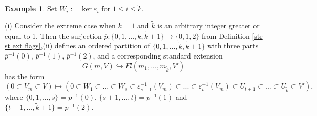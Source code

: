 \documentclass[12pt]{amsart}
\theoremstyle{definition}
\newtheorem{example}[theorem]{Example}
\begin{document}
\begin{example}\label{example 3.3}
Set $W_i:=\ker\varepsilon_i$ for $1\le i\le\tilde{k}$.

(i) Consider the extreme case when $k=1$ and $\tilde{k}$ is an 
arbitrary integer greater or equal to 1. Then the surjection 
$\overline{p}:\{0,1,...,\tilde{k},\tilde{k}+1\}\to\{0,1,2\}$ 
from Definition \ref{str st ext flags},(ii)
defines an ordered partition of $\{0,1,...,\tilde{k},
\tilde{k}+1\}$ with three parts $\overline{p}^{-1}(0)$, 
$\overline{p}^{-1}(1)$, $\overline{p}^{-1}(2)$, and a 
corresponding standard extension 
$$
G(m,V)\hookrightarrow Fl(m_1,...,m_{\tilde{k}},V')
$$
has the form
$$
(0\subset V_m\subset V)\mapsto(0\subset W_1\subset...\subset 
W_s\subset\varepsilon_{s+1}^{-1}(V_m)\subset...\subset
\varepsilon_t^{-1}(V_m)\subset U_{t+1}\subset...\subset 
U_{\tilde{k}}\subset V'),
$$
where $\{0,1,...,s\}=\overline{p}^{-1}(0)$, $\{s+1,...,t\}=
\overline{p}^{-1}(1)$ and $\{t+1,...,\tilde{k}+1\}=
\overline{p}^{-1}(2)$. 
 

\end{example}
\end{document}
